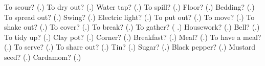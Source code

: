\begin{tcolorbox}[breakable,colback=teal!4,colframe=teal!35!black,title={Before you move on}]
To scour? (\textbf{}.) To dry out? (\textbf{}.) Water tap? (\textbf{}.) To spill? (\textbf{}.) Floor? (\textbf{}.) Bedding? (\textbf{}.) To spread out? (\textbf{}.) Swing? (\textbf{}.) Electric light? (\textbf{}.) To put out? (\textbf{}.) To move? (\textbf{}.) To shake out? (\textbf{}.) To cover? (\textbf{}.) To break? (\textbf{}.) To gather? (\textbf{ }.) Housework? (\textbf{}.) Bell? (\textbf{}.) To tidy up? (\textbf{}.) Clay pot? (\textbf{}.) Corner? (\textbf{}.) Breakfast? (\textbf{}.) Meal? (\textbf{}.) To have a meal? (\textbf{}.) To serve? (\textbf{}.) To share out? (\textbf{}.) Tin? (\textbf{}.) Sugar? (\textbf{}.) Black pepper? (\textbf{}.) Mustard seed? (\textbf{}.) Cardamom? (\textbf{}.)
\end{tcolorbox}

